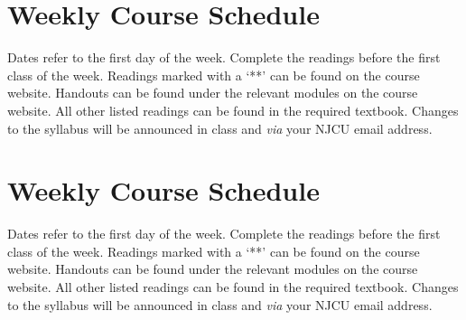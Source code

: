 \documentclass[article,oneside]{memoir}
\begin{document}
\section{Weekly Course Schedule}
Dates refer to the first day of the week. Complete the readings before the first class of the week. Readings marked with a `**' can be found on the course website. Handouts can be found under the relevant modules on the course website. All other listed readings can be found in the required textbook. Changes to the syllabus will be announced in class and \emph{via} your NJCU email address.
\section{Weekly Course Schedule}
Dates refer to the first day of the week. Complete the readings before the first class of the week. Readings marked with a `**' can be found on the course website. Handouts can be found under the relevant modules on the course website. All other listed readings can be found in the required textbook. Changes to the syllabus will be announced in class and \emph{via} your NJCU email address.
\end{document}
